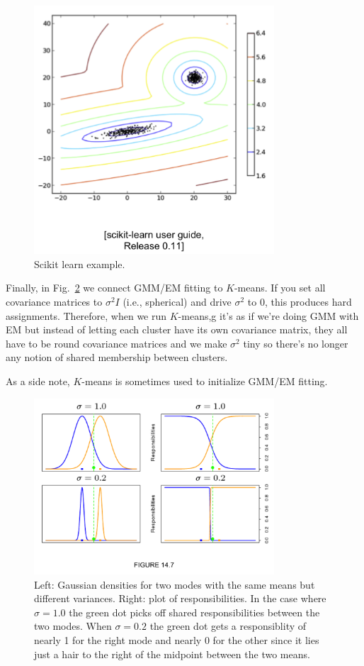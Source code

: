 \documentclass[a4paper]{article}
\begin{document}
\begin{figure}
\centering
\includegraphics[width=0.8\textwidth]{scikit.png}
\caption{
	\label{fig:gmm_3}
    Scikit learn example.
}
\end{figure}

Finally, in Fig.\ \ref{fig:gmm_4} we connect GMM/EM fitting  to $K$-means.  
If you set all covariance matrices to $\sigma^2 I$ (i.e., spherical) and drive $\sigma^2$ to 0, this produces hard assignments.  
Therefore, when we run $K$-means,g it's as if we're doing GMM with EM but instead of letting each cluster have its own covariance matrix, they all have to be round covariance matrices and we make $\sigma^2$ tiny so there's no longer any notion of shared membership between clusters.  

As a side note, $K$-means is sometimes used to initialize GMM/EM fitting.

\begin{figure}
\centering
\includegraphics[width=0.8\textwidth]{fig14_7.png}
\caption{
	\label{fig:gmm_4}
	Left: Gaussian densities for two modes with the same means but different variances.  
	Right: plot of responsibilities.  
    In the case where $\sigma=1.0$ the green dot picks off shared responsibilities between the two modes.  
    When $\sigma=0.2$ the green dot gets a responsiblity of nearly 1 for the right mode and nearly 0 for the other since it lies just a hair to the right of the midpoint between the two means.  
}
\end{figure}
\end{document}

